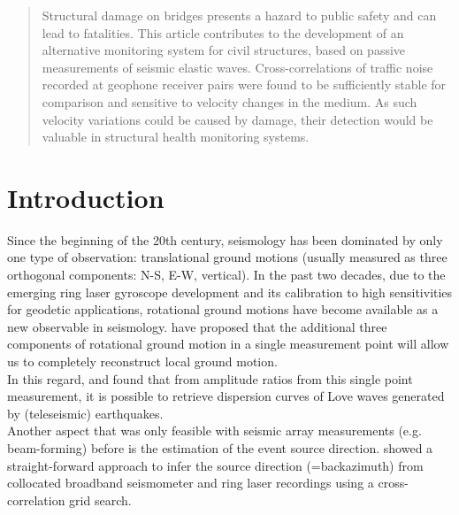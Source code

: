 \documentclass[12pt,reqno]{article} %
\begin{document}
\begin{abstract}
Structural damage on bridges presents a hazard to public safety and can lead to fatalities. This article contributes to the development of an alternative monitoring system for civil structures, based on passive measurements of seismic elastic waves. Cross-correlations of traffic noise recorded at geophone receiver pairs were found to be sufficiently stable for comparison and sensitive to velocity changes in the medium. As such velocity variations could be caused by damage, their detection would be valuable in structural health monitoring systems.

\end{abstract}
% 
% 
% 
% 
\section{Introduction}
Since the beginning of the 20th century, seismology has been dominated by only one type of observation: translational ground motions (usually measured as three orthogonal components: N-S, E-W, vertical). In the past two decades, due to the emerging ring laser gyroscope development and its calibration to high sensitivities \citep{Stedman1995,Stedman1997,Schreiber2003, Schreiber2004} for geodetic applications, rotational ground motions have become available as a new observable in seismology. \cite{AkiRichards2002} have proposed that the additional three components of rotational ground motion in a single measurement point will allow us to completely reconstruct local ground motion.\\ 
In this regard, \cite{Igel2005} and \cite{Kurrle2010} found that from amplitude ratios from this single point measurement, it is possible to retrieve dispersion curves of Love waves generated by (teleseismic) earthquakes.\\
Another aspect that was only feasible with seismic array measurements (e.g. beam-forming) before is the estimation of the event source direction. \cite{Igel2007} showed a straight-forward approach to infer the source direction (=backazimuth) from  collocated broadband seismometer and ring laser recordings using a cross-correlation grid search.
\end{document}
